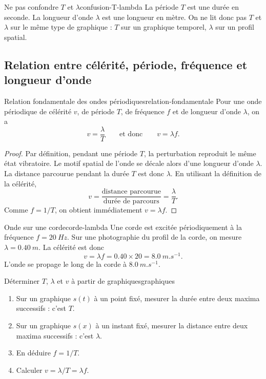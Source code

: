 \documentclass[11pt,a4paper]{article}
\begin{document}
\begin{warningbox}{Ne pas confondre $T$ et $\lambda$}{confusion-T-lambda}
La période $T$ est une durée en seconde. La longueur d'onde $\lambda$ est une longueur en mètre. On ne lit donc pas $T$ et $\lambda$ sur le même type de graphique : $T$ sur un graphique temporel, $\lambda$ sur un profil spatial.
\end{warningbox}

\subsection{Relation entre célérité, période, fréquence et longueur d'onde}

\begin{theorembox}{Relation fondamentale des ondes périodiques}{relation-fondamentale}
Pour une onde périodique de célérité $v$, de période $T$, de fréquence $f$ et de longueur d'onde $\lambda$, on a
\[
\boxed{v=\frac{\lambda}{T}} \qquad \text{et donc} \qquad \boxed{v=\lambda f}.
\]
\end{theorembox}

\begin{proof}
Par définition, pendant une période $T$, la perturbation reproduit le même état vibratoire. Le motif spatial de l'onde se décale alors d'une longueur d'onde $\lambda$. La distance parcourue pendant la durée $T$ est donc $\lambda$. En utilisant la définition de la célérité,
\[
v=\frac{\text{distance parcourue}}{\text{durée de parcours}}=\frac{\lambda}{T}.
\]
Comme $f=1/T$, on obtient immédiatement $v=\lambda f$.
\end{proof}

\begin{examplebox}{Onde sur une corde}{corde-lambda}
Une corde est excitée périodiquement à la fréquence $f=\SI{20}{Hz}$. Sur une photographie du profil de la corde, on mesure $\lambda=\SI{0.40}{m}$. La célérité est donc
\[
v=\lambda f=0.40\times 20=\SI{8.0}{m.s^{-1}}.
\]
L'onde se propage le long de la corde à $\SI{8.0}{m.s^{-1}}$.
\end{examplebox}

\begin{methodbox}{Déterminer $T$, $\lambda$ et $v$ à partir de graphiques}{graphiques}
\begin{enumerate}[label=\arabic*)]
  \item Sur un graphique $s(t)$ à un point fixé, mesurer la durée entre deux maxima successifs : c'est $T$.
  \item Sur un graphique $s(x)$ à un instant fixé, mesurer la distance entre deux maxima successifs : c'est $\lambda$.
  \item En déduire $f=1/T$.
  \item Calculer $v=\lambda/T=\lambda f$.
\end{enumerate}
\end{methodbox}
\end{document}
